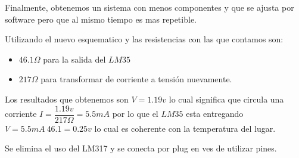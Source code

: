 Finalmente, obtenemos un sistema con menos componentes y que se ajusta por software pero 
que al mismo tiempo es mas repetible. 

Utilizando el nuevo esquematico y las resistencias con las que contamos son:
\begin{itemize}
 \item $46.1\Omega$ para la salida del $LM35$
 \item $217\Omega$ para transformar de corriente a tensión nuevamente.
\end{itemize}

Los resultados que obtenemos son $V=1.19v$ lo cual significa que circula una corriente
$I=\dfrac{1.19v}{217\Omega}=5.5mA$ por lo que el $LM35$ esta entregando 
$V=5.5mA~46.1=0.25v$ lo cual es coherente con la temperatura del lugar.

Se elimina el uso del LM317 y se conecta por plug en ves de utilizar pines.